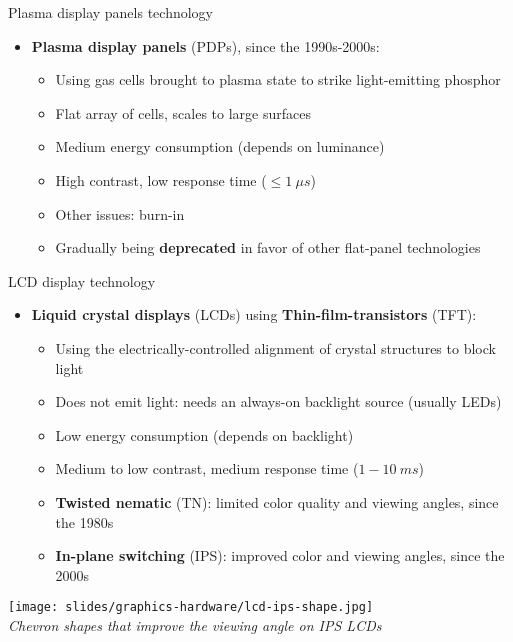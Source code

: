 \begin{frame}{Plasma display panels technology}
  \begin{itemize}
  \item \textbf{Plasma display panels} (PDPs), since the 1990s-2000s:
    \begin{itemize}
    \item Using gas cells brought to plasma state to strike light-emitting phosphor
    \item Flat array of cells, scales to large surfaces
    \item Medium energy consumption (depends on luminance)
    \item High contrast, low response time (\(\leq 1~\mu s\))
    \item Other issues: burn-in
    \item Gradually being \textbf{deprecated} in favor of other flat-panel technologies
    \end{itemize}
  \end{itemize}
\end{frame}

\begin{frame}{LCD display technology}
  \begin{itemize}
  \item \textbf{Liquid crystal displays} (LCDs) using \textbf{Thin-film-transistors} (TFT):
    \begin{itemize}
    \item Using the electrically-controlled alignment of crystal structures to block light
    \item Does not emit light: needs an always-on backlight source (usually LEDs)
    \item Low energy consumption (depends on backlight)
    \item Medium to low contrast, medium response time (\(1-10~ms\))
    \item \textbf{Twisted nematic} (TN): limited color quality and viewing angles, since the 1980s
    \item \textbf{In-plane switching} (IPS): improved color and viewing angles, since the 2000s
    \end{itemize}
  \end{itemize}

  \begin{center}
  \texttt{[image: slides/graphics-hardware/lcd-ips-shape.jpg]}\\
  \textit{\small Chevron shapes that improve the viewing angle on IPS LCDs}
  \end{center}
\end{frame}

